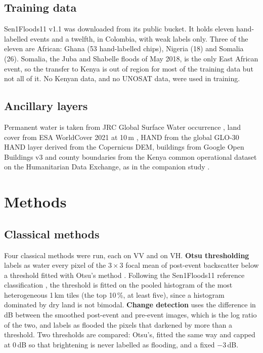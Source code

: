 \documentclass[11pt]{article}
\begin{document}
\subsection{Training data}

Sen1Floods11 v1.1 \cite{bonafilia2020} was downloaded from its public bucket.
It holds eleven hand-labelled events and a twelfth, in Colombia, with weak
labels only. Three of the eleven are African: Ghana (53 hand-labelled chips),
Nigeria (18) and Somalia (26). Somalia, the Juba and Shabelle floods of May
2018, is the only East African event, so the transfer to Kenya is out of
region for most of the training data but not all of it. No Kenyan data, and
no UNOSAT data, were used in training.

\subsection{Ancillary layers}

Permanent water is taken from JRC Global Surface Water occurrence
\cite{pekel2016}, land cover from ESA WorldCover 2021 at 10\,m
\cite{zanaga2022}, HAND from the global GLO-30 HAND layer derived from the
Copernicus DEM, buildings from Google Open Buildings v3 \cite{sirko2021} and
county boundaries from the Kenya common operational dataset on the
Humanitarian Data Exchange, as in the companion study
\cite{ouma2026drought}.

\section{Methods}
\label{sec:methods}

\subsection{Classical methods}

Four classical methods were run, each on VV and on VH. \textbf{Otsu
thresholding} labels as water every pixel of the 3\,$\times$\,3 focal mean of
post-event backscatter below a threshold fitted with Otsu's method
\cite{otsu1979}. Following the Sen1Floods11 reference classification
\cite{bonafilia2020}, the threshold is fitted on the pooled histogram of the
most heterogeneous 1\,km tiles (the top 10\,\%, at least five), since a
histogram dominated by dry land is not bimodal. \textbf{Change detection}
uses the difference in dB between the smoothed post-event and pre-event images,
which is the log ratio of the two, and labels as flooded the pixels that
darkened by more than a threshold. Two thresholds are compared: Otsu's,
fitted the same way and capped at 0\,dB so that brightening is never labelled
as flooding, and a fixed $-3$\,dB.
\end{document}

